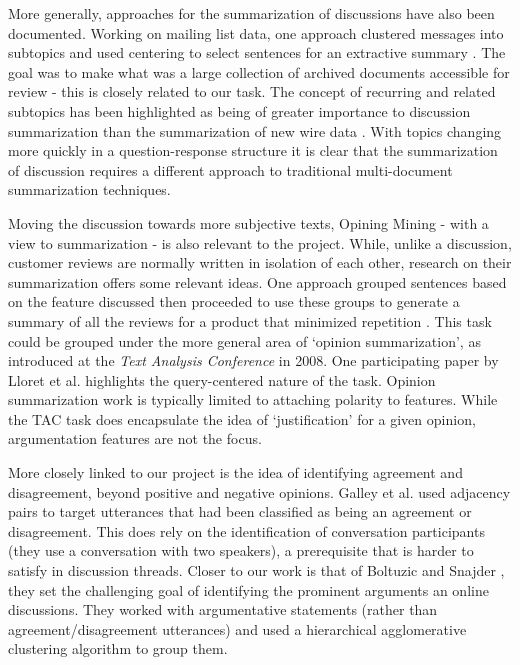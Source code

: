     More generally, approaches for the summarization of discussions have also been documented. Working on mailing list data, one approach clustered messages into subtopics and used centering to select sentences for an extractive summary \cite{newman2003summarizing}. The goal was to make what was a large collection of archived documents accessible for review - this is closely related to our task. The concept of recurring and related subtopics has been highlighted as being of greater importance to discussion summarization than the summarization of new wire data \cite{zhou2006summarization}. With topics changing more quickly in a question-response structure it is clear that the summarization of discussion requires a different approach to traditional multi-document summarization techniques.

    Moving the discussion towards more subjective texts, Opining Mining - with a view to summarization - is also relevant to the project. While, unlike a discussion, customer reviews are normally written in isolation of each other, research on their summarization offers some relevant ideas. One approach grouped sentences based on the feature discussed then proceeded to use these groups to generate a summary of all the reviews for a product that minimized repetition \cite{hu2004mining}. This task could be grouped under the more general area of `opinion summarization', as introduced at the \textit{Text Analysis Conference} in 2008. One participating paper by Lloret et al. \cite{lloret2009towards} highlights the query-centered nature of the task. Opinion summarization work is typically limited to attaching polarity to features. While the TAC task does encapsulate the idea of `justification' for a given opinion, argumentation features are not the focus.

    More closely linked to our project is the idea of identifying agreement and disagreement, beyond positive and negative opinions. Galley et al. \cite{galley2004identifying} used adjacency pairs to target utterances that had been classified as being an agreement or disagreement. This does rely on the identification of conversation participants (they use a conversation with two speakers), a prerequisite that is harder to satisfy in discussion threads. Closer to our work is that of Boltuzic and Snajder \cite{boltuzic2015identifying}, they set the challenging goal of identifying the prominent arguments an online discussions. They worked with argumentative statements (rather than agreement/disagreement utterances) and used a hierarchical agglomerative clustering algorithm to group them.

